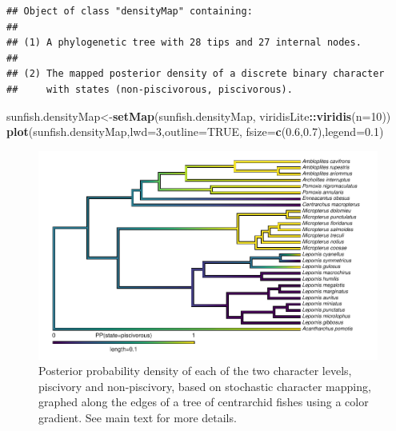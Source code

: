 \documentclass[fleqn,10pt,lineno]{wlpeerj} %
\newenvironment{Shaded}{\begin{snugshade}}{\end{snugshade}}
\newcommand{\AttributeTok}[1]{\textcolor[rgb]{0.13,0.29,0.53}{#1}}
\newcommand{\ConstantTok}[1]{\textcolor[rgb]{0.56,0.35,0.01}{#1}}
\newcommand{\DecValTok}[1]{\textcolor[rgb]{0.00,0.00,0.81}{#1}}
\newcommand{\FloatTok}[1]{\textcolor[rgb]{0.00,0.00,0.81}{#1}}
\newcommand{\FunctionTok}[1]{\textcolor[rgb]{0.13,0.29,0.53}{\textbf{#1}}}
\newcommand{\NormalTok}[1]{#1}
\newcommand{\OtherTok}[1]{\textcolor[rgb]{0.56,0.35,0.01}{#1}}
\newcommand{\SpecialCharTok}[1]{\textcolor[rgb]{0.81,0.36,0.00}{\textbf{#1}}}
\begin{document}
\begin{verbatim}
## Object of class "densityMap" containing:
## 
## (1) A phylogenetic tree with 28 tips and 27 internal nodes.
## 
## (2) The mapped posterior density of a discrete binary character
##     with states (non-piscivorous, piscivorous).
\end{verbatim}

\begin{Shaded}
\begin{Highlighting}[]
\NormalTok{sunfish.densityMap}\OtherTok{\textless{}{-}}\FunctionTok{setMap}\NormalTok{(sunfish.densityMap,}
\NormalTok{  viridisLite}\SpecialCharTok{::}\FunctionTok{viridis}\NormalTok{(}\AttributeTok{n=}\DecValTok{10}\NormalTok{))}
\FunctionTok{plot}\NormalTok{(sunfish.densityMap,}\AttributeTok{lwd=}\DecValTok{3}\NormalTok{,}\AttributeTok{outline=}\ConstantTok{TRUE}\NormalTok{,}
  \AttributeTok{fsize=}\FunctionTok{c}\NormalTok{(}\FloatTok{0.6}\NormalTok{,}\FloatTok{0.7}\NormalTok{),}\AttributeTok{legend=}\FloatTok{0.1}\NormalTok{)}
\end{Highlighting}
\end{Shaded}

\begin{figure}
\includegraphics[width=1\linewidth]{Revell.phytools-v2_peerj_files/figure-latex/densityMap-1} \caption{Posterior probability density of each of the two character levels, piscivory and non-piscivory, based on stochastic character mapping, graphed along the edges of a tree of centrarchid fishes using a color gradient. See main text for more details.}\label{fig:densityMap}
\end{figure}
\end{document}
